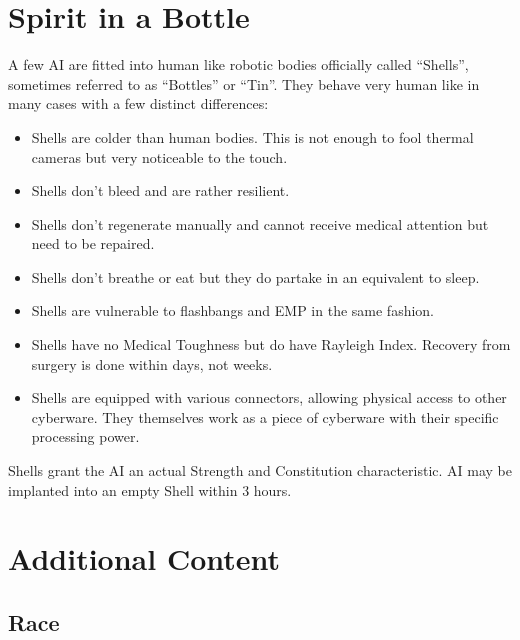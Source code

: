 \documentclass[12pt,a4paper]{book}
\begin{document}
	\chapter{Spirit in a Bottle}
	A few AI are fitted into human like robotic bodies officially called “Shells”, sometimes referred to as “Bottles” or “Tin”. They behave very human like in many cases with a few distinct differences:
	\begin{itemize}
		\item Shells are colder than human bodies. This is not enough to fool thermal cameras but very noticeable to the touch.
		\item Shells don’t bleed and are rather resilient.
		\item Shells don’t regenerate manually and cannot receive medical attention but need to be repaired.
		\item Shells don’t breathe or eat but they do partake in an equivalent to sleep.
		\item Shells are vulnerable to flashbangs and EMP in the same fashion.
		\item Shells have no Medical Toughness but do have Rayleigh Index. Recovery from surgery is done within days, not weeks.
		\item Shells are equipped with various connectors, allowing physical access to other cyberware. They themselves work as a piece of cyberware with their specific processing power.
	\end{itemize}
	
	Shells grant the AI an actual Strength and Constitution characteristic. AI may be implanted into an empty Shell within 3 hours.
	
	\chapter{Additional Content}
	\section{Race}
\end{document}

